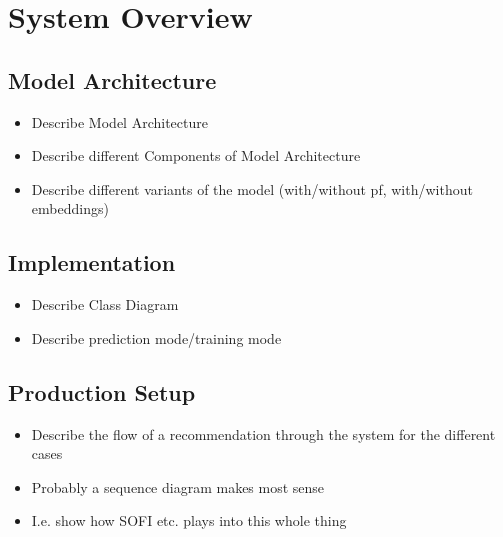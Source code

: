 \chapter{System Overview}

\section{Model Architecture}
\begin{itemize}
\item Describe Model Architecture
\item Describe different Components of Model Architecture
\item Describe different variants of the model (with/without pf, with/without embeddings)
\end{itemize}

\section{Implementation}
\begin{itemize}
\item Describe Class Diagram
\item Describe prediction mode/training mode
\end{itemize}

\section{Production Setup}
\begin{itemize}
    \item Describe the flow of a recommendation through the system for the different cases
    \item Probably a sequence diagram makes most sense
    \item I.e. show how SOFI etc. plays into this whole thing
\end{itemize}
